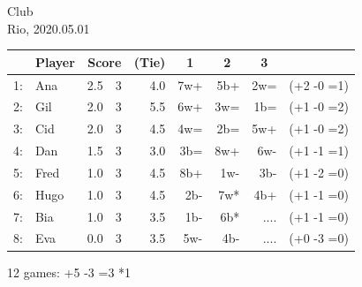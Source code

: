 \documentclass{scrartcl}
\begin{document}
\setlength{\parindent}{0cm}
\small
Club\\
Rio, 2020.05.01\\
\begin{longtable}{rlr@{ / }rrr@{ }r@{ }rr}
\toprule
  & \bfseries Player &  \multicolumn{2}{c}{\bfseries Score} & \bfseries (Tie) & \multicolumn{1}{c}{\bfseries 1} &  \multicolumn{1}{c}{\bfseries 2} &  \multicolumn{1}{c}{\bfseries 3} &  \\
\midrule
\endhead
 1:  &Ana   &   2.5  &  3   & 4.0  &  7w+ &  5b+ &  2w= &  (+2 -0 =1) \\
 2:  &Gil   &   2.0  &  3   & 5.5  &  6w+ &  3w= &  1b= &  (+1 -0 =2) \\
 3:  &Cid   &   2.0  &  3   & 4.5  &  4w= &  2b= &  5w+ &  (+1 -0 =2) \\
 4:  &Dan   &   1.5  &  3   & 3.0  &  3b= &  8w+ &  6w- &  (+1 -1 =1) \\
 5:  &Fred  &   1.0  &  3   & 4.5  &  8b+ &  1w- &  3b- &  (+1 -2 =0) \\
 6:  &Hugo  &   1.0  &  3   & 4.5  &  2b- &  7w* &  4b+ &  (+1 -1 =0) \\
 7:  &Bia   &   1.0  &  3   & 3.5  &  1b- &  6b* & .... &  (+1 -1 =0) \\
 8:  &Eva   &   0.0  &  3   & 3.5  &  5w- &  4b- & .... &  (+0 -3 =0) \\
\bottomrule
\end{longtable}
12 games: +5 -3 =3 *1
\end{document}
